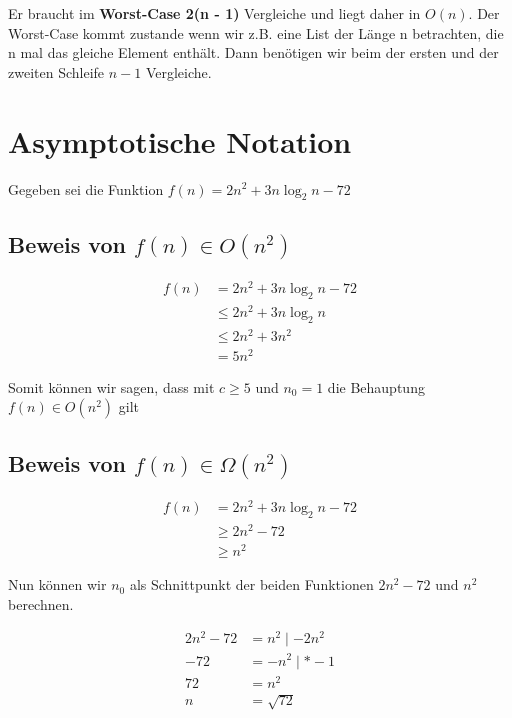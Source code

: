 \documentclass{article}
\begin{document}
Er braucht im \textbf{Worst-Case 2(n - 1)} Vergleiche und liegt daher in $O(n)$. Der Worst-Case kommt zustande wenn wir z.B. eine List der
Länge n betrachten, die n mal das gleiche Element enthält. Dann benötigen wir beim der ersten und der zweiten Schleife $n - 1$ Vergleiche.

\section{Asymptotische Notation}

Gegeben sei die Funktion $f(n) = 2n^2 + 3n\log_2n - 72$

\subsection{Beweis von $f(n) \in O(n^2)$}

\begin{align*}
	f(n) & = 2n^2 + 3n\log_2n - 72 \\
	     & \leq 2n^2 + 3n\log_2n   \\
	     & \leq 2n^2 + 3n^2        \\
	     & = 5n^2
\end{align*}

\begin{flushleft}
	Somit können wir sagen, dass mit $c \geq 5$ und $n_0 = 1$ die Behauptung $f(n) \in O(n^2)$ gilt
\end{flushleft}

\subsection{Beweis von $f(n) \in \Omega(n^2)$}

\begin{align*}
	f(n) & = 2n^2 + 3n\log_2n - 72 \\
	     & \geq 2n^2 - 72          \\
	     & \geq n^2
\end{align*}

\begin{flushleft}
	Nun können wir $n_0$ als Schnittpunkt der beiden Funktionen $2n^2 - 72$ und $n^2$ berechnen.
\end{flushleft}

\begin{align*}
	2n^2 - 72 & = n^2 \mid - 2n^2 \\
	- 72      & = -n^2 \mid * -1  \\
	72        & = n^2             \\
	n         & = \sqrt{72}
\end{align*}
\end{document}
